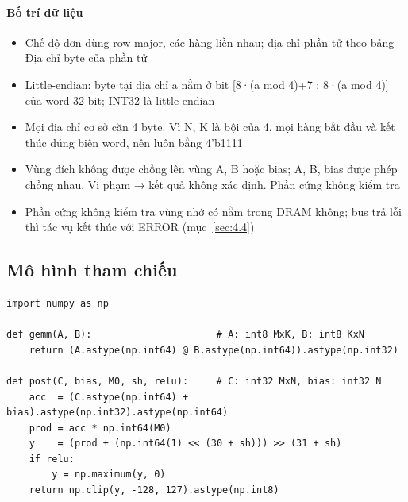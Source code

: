 \paragraph{Bố trí dữ liệu}\label{tab:2-4}
\begin{itemize}
\item Chế độ đơn dùng row-major, các hàng liền nhau; địa chỉ phần tử theo bảng Địa chỉ byte của phần tử
\item Little-endian: byte tại địa chỉ a nằm ở bit [8·(a mod 4)+7 : 8·(a mod 4)] của word 32 bit; INT32 là little-endian
\item Mọi địa chỉ cơ sở căn 4 byte. Vì N, K là bội của 4, mọi hàng bắt đầu và kết thúc đúng biên word, nên  luôn bằng 4'b1111
\item Vùng đích không được chồng lên vùng A, B hoặc bias; A, B, bias được phép chồng nhau. Vi phạm → kết quả không xác định. Phần cứng không kiểm tra
\item Phần cứng không kiểm tra vùng nhớ có nằm trong DRAM không; bus trả lỗi thì tác vụ kết thúc với ERROR (mục~\ref{sec:4.4})
\end{itemize}


\subsection{Mô hình tham chiếu}\label{sec:2.4}

\begin{Verbatim}[frame=leftline,framerule=2pt,rulecolor=\color{brand},xleftmargin=6pt,samepage=true]
import numpy as np

def gemm(A, B):                      # A: int8 MxK, B: int8 KxN
    return (A.astype(np.int64) @ B.astype(np.int64)).astype(np.int32)

def post(C, bias, M0, sh, relu):     # C: int32 MxN, bias: int32 N
    acc  = (C.astype(np.int64) + bias).astype(np.int32).astype(np.int64)
    prod = acc * np.int64(M0)
    y    = (prod + (np.int64(1) << (30 + sh))) >> (31 + sh)
    if relu:
        y = np.maximum(y, 0)
    return np.clip(y, -128, 127).astype(np.int8)
\end{Verbatim}

